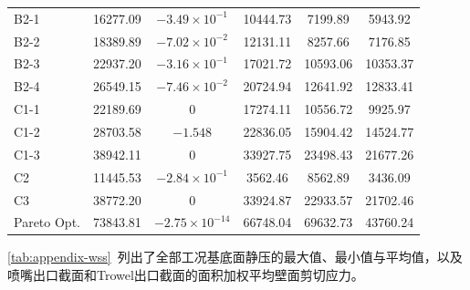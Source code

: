 \begin{table}[!htb]
\begin{tabular}{@{}lccccc@{}}
    B2-1         & 16277.09  & $-3.49\times10^{-1}$ & 10444.73 &  7199.89 &  5943.92 \\
    B2-2         & 18389.89  & $-7.02\times10^{-2}$ & 12131.11 &  8257.66 &  7176.85 \\
    B2-3         & 22937.20  & $-3.16\times10^{-1}$ & 17021.72 & 10593.06 & 10353.37 \\
    B2-4         & 26549.15  & $-7.46\times10^{-2}$ & 20724.94 & 12641.92 & 12833.41 \\
    C1-1         & 22189.69  & $0$                  & 17274.11 & 10556.72 &  9925.97 \\
    C1-2         & 28703.58  & $-1.548$             & 22836.05 & 15904.42 & 14524.77 \\
    C1-3         & 38942.11  & $0$                  & 33927.75 & 23498.43 & 21677.26 \\
    C2           & 11445.53  & $-2.84\times10^{-1}$ &  3562.46 &  8562.89 &  3436.09 \\
    C3           & 38772.20  & $0$                  & 33924.87 & 22933.57 & 21702.46 \\
    Pareto Opt.  & 73843.81  & $-2.75\times10^{-14}$& 66748.04 & 69632.73 & 43760.24 \\
    \bottomrule
  \end{tabular}
\end{table}



\cref{tab:appendix-wss}~列出了全部工况基底面静压的最大值、最小值与平均值，以及喷嘴出口截面和Trowel出口截面的面积加权平均壁面剪切应力。

